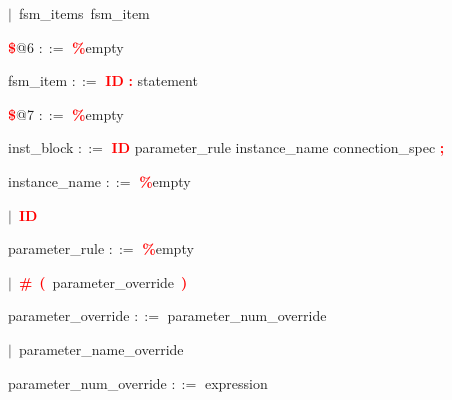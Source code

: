 \mbox{$|$ fsm\_items fsm\_item}

\vspace{1em}
\noindent
\settowidth{\parindent}{\hspace{4ex}}
\textbf{\textcolor{red}{\$}}@6 $::=$\hspace{1ex} \textbf{\textcolor{red}{\%}}empty

\vspace{1em}
\noindent
\settowidth{\parindent}{\hspace{4ex}}
fsm\_item $::=$\hspace{1ex} \textbf{\textcolor{red}{ID}} \textbf{\textcolor{red}{:}} statement

\vspace{1em}
\noindent
\settowidth{\parindent}{\hspace{4ex}}
\textbf{\textcolor{red}{\$}}@7 $::=$\hspace{1ex} \textbf{\textcolor{red}{\%}}empty

\vspace{1em}
\noindent
\settowidth{\parindent}{\hspace{4ex}}
inst\_block $::=$\hspace{1ex} \textbf{\textcolor{red}{ID}} parameter\_rule instance\_name connection\_spec \textbf{\textcolor{red}{;}}

\vspace{1em}
\noindent
\settowidth{\parindent}{\hspace{4ex}}
instance\_name $::=$\hspace{1ex} \textbf{\textcolor{red}{\%}}empty

\mbox{$|$ \textbf{\textcolor{red}{ID}}}

\vspace{1em}
\noindent
\settowidth{\parindent}{\hspace{4ex}}
parameter\_rule $::=$\hspace{1ex} \textbf{\textcolor{red}{\%}}empty

\mbox{$|$ \textbf{\textcolor{red}{\textbf{\textcolor{red}{\#}}}} \textbf{\textcolor{red}{(}} parameter\_override \textbf{\textcolor{red}{)}}}

\vspace{1em}
\noindent
\settowidth{\parindent}{\hspace{4ex}}
parameter\_override $::=$\hspace{1ex} parameter\_num\_override

\mbox{$|$ parameter\_name\_override}

\vspace{1em}
\noindent
\settowidth{\parindent}{\hspace{4ex}}
parameter\_num\_override $::=$\hspace{1ex} expression

